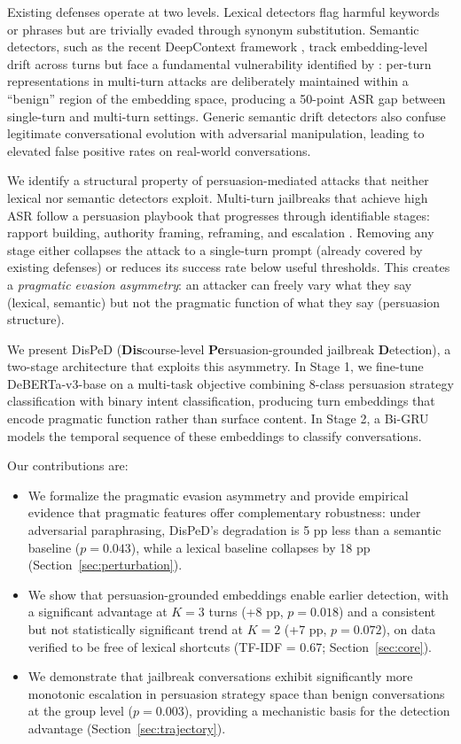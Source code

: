 \documentclass[11pt,a4paper]{article}
\begin{document}
Existing defenses operate at two levels.
Lexical detectors flag harmful keywords or phrases but are trivially evaded through synonym substitution.
Semantic detectors, such as the recent DeepContext framework \citep{deepcontext2026}, track embedding-level drift across turns but face a fundamental vulnerability identified by \citet{bullwinkel2025multiturnjailbreaks}: per-turn representations in multi-turn attacks are deliberately maintained within a ``benign'' region of the embedding space, producing a 50-point ASR gap between single-turn and multi-turn settings.
Generic semantic drift detectors also confuse legitimate conversational evolution with adversarial manipulation, leading to elevated false positive rates on real-world conversations.

We identify a structural property of persuasion-mediated attacks that neither lexical nor semantic detectors exploit.
Multi-turn jailbreaks that achieve high ASR follow a persuasion playbook that progresses through identifiable stages: rapport building, authority framing, reframing, and escalation \citep{zeng2024pap, hagendorff2026persuasion}.
Removing any stage either collapses the attack to a single-turn prompt (already covered by existing defenses) or reduces its success rate below useful thresholds.
This creates a \emph{pragmatic evasion asymmetry}: an attacker can freely vary what they say (lexical, semantic) but not the pragmatic function of what they say (persuasion structure).

We present DisPeD (\textbf{Dis}course-level \textbf{Pe}rsuasion-grounded jailbreak \textbf{D}etection), a two-stage architecture that exploits this asymmetry.
In Stage 1, we fine-tune DeBERTa-v3-base on a multi-task objective combining 8-class persuasion strategy classification with binary intent classification, producing turn embeddings that encode pragmatic function rather than surface content.
In Stage 2, a Bi-GRU models the temporal sequence of these embeddings to classify conversations.

Our contributions are:
\begin{itemize}[nosep]
\item We formalize the pragmatic evasion asymmetry and provide empirical evidence that pragmatic features offer complementary robustness: under adversarial paraphrasing, DisPeD's degradation is 5 pp less than a semantic baseline ($p{=}0.043$), while a lexical baseline collapses by 18 pp (Section~\ref{sec:perturbation}).
\item We show that persuasion-grounded embeddings enable earlier detection, with a significant advantage at $K{=}3$ turns (+8 pp, $p{=}0.018$) and a consistent but not statistically significant trend at $K{=}2$ (+7 pp, $p{=}0.072$), on data verified to be free of lexical shortcuts (TF-IDF = 0.67; Section~\ref{sec:core}).
\item We demonstrate that jailbreak conversations exhibit significantly more monotonic escalation in persuasion strategy space than benign conversations at the group level ($p{=}0.003$), providing a mechanistic basis for the detection advantage (Section~\ref{sec:trajectory}).
\end{itemize}
\end{document}
